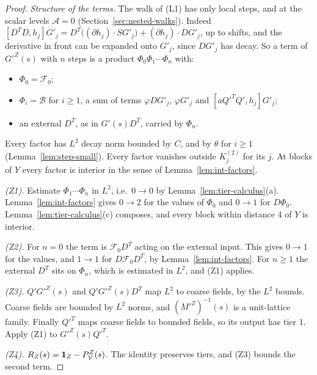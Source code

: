 \begin{proof}
\emph{Structure of the terms.} The walk of (L1) has only local steps, and at the scalar levels $\mathcal A=0$ (Section~\ref{sec:nested-walks}). Indeed $[D^TD,h_j]G'_j=D^T\big((\partial h_j)\cdot SG'_j\big)+(\partial h_j)\cdot DG'_j$, up to shifts, and the derivative in front can be expanded onto $G'_j$, since $DG'_j$ has decay. So a term of $G'^Z(s)$ with $n$ steps is a product $\Phi_0\Phi_1\cdots\Phi_n$ with:
\begin{itemize}
\item $\Phi_0=\mathcal F_0$;
\item $\Phi_i=\mathcal B$ for $i\ge1$, a sum of terms $\varphi DG'_j$, $\varphi G'_j$ and $[aQ'^TQ',h_j]G'_j$;
\item an external $D^T$, as in $G'(s)D^T$, carried by $\Phi_n$.
\end{itemize}
Every factor has $L^2$ decay norm bounded by $C$, and by $\theta$ for $i\ge1$ (Lemma~\ref{lem:step-small}). Every factor vanishes outside $K_j^{(2)}$ for its $j$. At blocks of $Y$ every factor is interior in the sense of Lemma~\ref{lem:int-factors}.

\emph{(Z1).} Estimate $\Phi_1\cdots\Phi_n$ in $L^2$, i.e.\ $0\to0$ by Lemma~\ref{lem:tier-calculus}(a). Lemma~\ref{lem:int-factors} gives $0\to2$ for the values of $\Phi_0$ and $0\to1$ for $D\Phi_0$. Lemma~\ref{lem:tier-calculus}(c) composes, and every block within distance $4$ of $Y$ is interior.

\emph{(Z2).} For $n=0$ the term is $\mathcal F_0D^T$ acting on the external input. This gives $0\to1$ for the values, and $1\to1$ for $D\mathcal F_0D^T$, by Lemma~\ref{lem:int-factors}. For $n\ge1$ the external $D^T$ sits on $\Phi_n$, which is estimated in $L^2$, and (Z1) applies.

\emph{(Z3).} $Q'G'^Z(s)$ and $Q'G'^Z(s)D^T$ map $L^2$ to coarse fields, by the $L^2$ bounds. Coarse fields are bounded by $L^2$ norms, and $(M'^Z)^{-1}(s)$ is a unit-lattice family. Finally $Q'^T$ maps coarse fields to bounded fields, so its output has tier $1$. Apply (Z1) to $G'^Z(s)Q'^T$.

\emph{(Z4).} $R_Z(s)=\mathbf 1_Z-P^Z_\mathcal V(s)$. The identity preserves tiers, and (Z3) bounds the second term.


\end{proof}
